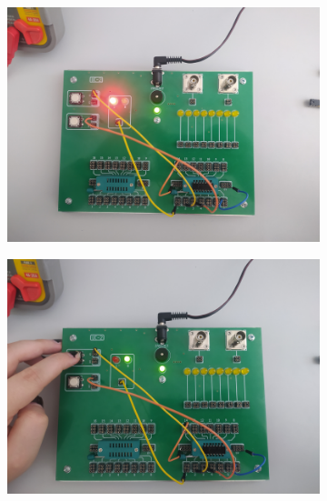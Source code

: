 \begin{itemize}
\begin{figure}[H]
\begin{subfigure}[h]{0.4\textwidth}
                    \includegraphics[width=\textwidth]{img/NOR/test/1652306732823_scaled.png}
                \end{subfigure}
                \begin{subfigure}[h]{0.4\textwidth}
                    \includegraphics[width=\textwidth]{img/NOR/test/1652306732810_scaled.png}
                \end{subfigure}
                \begin{subfigure}[h]{0.4\textwidth}

\end{subfigure}
\end{figure}
\end{itemize}
